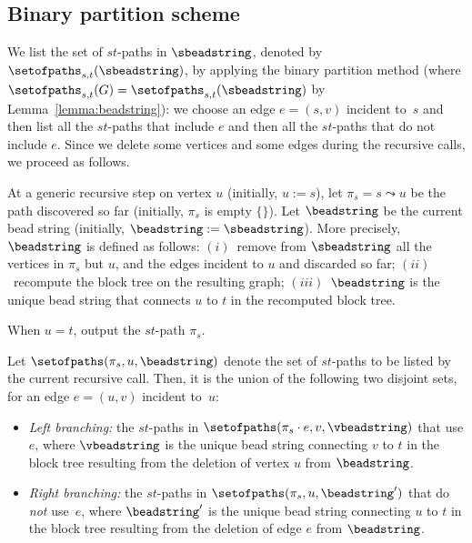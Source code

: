 \subsection{Binary partition scheme}
\label{sec:basic-scheme}

We list the set of $st$-paths in $\sbeadstring$, denoted by
$\setofpaths_{s,t}(\sbeadstring)$, by applying the binary partition
method (where $\setofpaths_{s,t}(G) = \setofpaths_{s,t}(\sbeadstring)$
by Lemma~\ref{lemma:beadstring}): we choose an edge $e = (s,v)$
incident to~$s$ and then list all the $st$-paths that include $e$ and
then all the $st$-paths that do not include $e$. Since we delete some
vertices and some edges during the recursive calls, we proceed as follows.

\smallskip

 At a generic recursive step on vertex $u$
(initially, $u:=s$), let $\pi_s = s \leadsto u$ be the path discovered
so far (initially, $\pi_s$ is empty $\{\}$). Let $\beadstring$ be the
current bead string (initially, $\beadstring :=
\sbeadstring$). More precisely, $\beadstring$ is defined as follows:
$(i)$~remove from $\sbeadstring$ all the vertices in $\pi_s$ but $u$, and
the edges incident to $u$ and discarded so far; $(ii)$~recompute the
block tree on the resulting graph; $(iii)$~$\beadstring$ is the unique
bead string that connects $u$ to $t$ in the recomputed block tree.

\smallskip

 When $u=t$, output the $st$-path $\pi_s$.

\smallskip

 Let $\setofpaths(\pi_s, u,
		\beadstring)$ denote the set of $st$-paths to be
		listed by the current recursive call. Then, it is the
		union of the following two disjoint sets, for an edge
		$e=(u,v)$ incident to~$u$:
\begin{itemize}
\item \emph{Left branching:} the $st$-paths in $\setofpaths(\pi_s \cdot e,
  v, \vbeadstring)$ that use $e$, where $\vbeadstring$ is the unique
  bead string connecting $v$ to $t$ in the block tree resulting from
  the deletion of vertex $u$ from $\beadstring$.
\item \emph{Right branching:} the $st$-paths in $\setofpaths(\pi_s, u,
  \beadstring')$ that do \emph{not} use~$e$, where $\beadstring'$ is
  the unique bead string connecting $u$ to $t$ in the block tree
  resulting from the deletion of edge $e$ from $\beadstring$.
\end{itemize}

